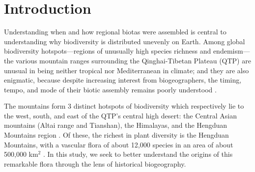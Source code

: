 \section{Introduction}


Understanding when and how regional biotas were assembled is central to understanding why biodiversity is distributed unevenly on Earth. Among global biodiversity hotspots---regions of unusually high species richness and endemism---the various mountain ranges surrounding the Qinghai-Tibetan Plateau (QTP) are unusual in being neither tropical nor Mediterranean in climate; and they are also enigmatic, because despite increasing interest from biogeographers, the timing, tempo, and mode of their biotic assembly remains poorly understood \citep{Favre2014,Wen2014}.

The mountains form 3 distinct hotspots of biodiversity which respectively lie to the west, south, and east of the QTP's central high desert: the Central Asian mountains (Altai range and Tianshan), the Himalayas, and the Hengduan Mountains region \citep{Favre2014}. Of these, the richest in plant diversity is the Hengduan Mountains, with a vascular flora of about 12,000 species in an area of about 500,000 km$^2$ \citep{Boufford2014,LiEtLi1993,Wu1988}. In this study, we seek to better understand the origins of this remarkable flora through the lens of historical biogeography.


